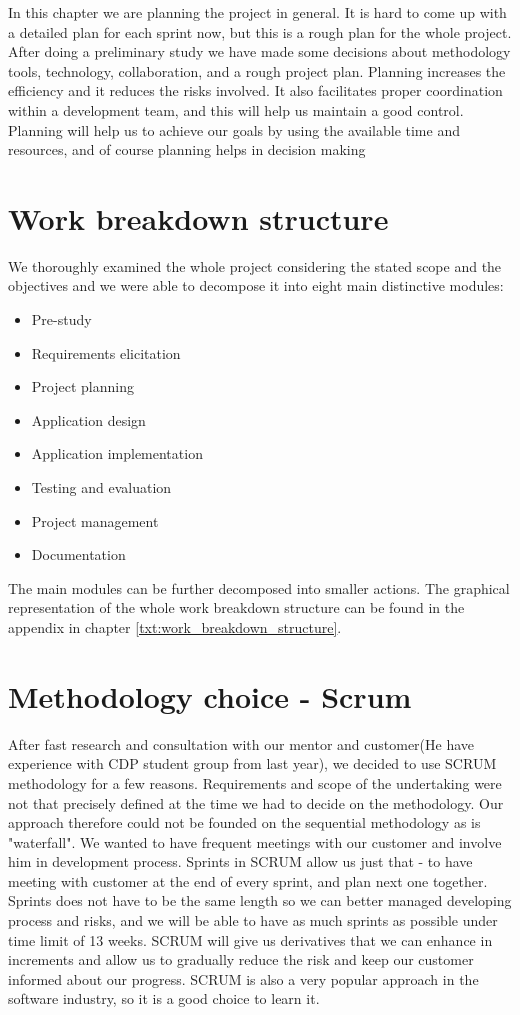 In this chapter we are planning the project in general. It is hard to come up with a detailed plan for each sprint now, but this is a rough plan for the whole project. After doing a preliminary study we have made some decisions about methodology tools, technology, collaboration, and a rough project plan. Planning increases the efficiency and it reduces the risks involved. It also facilitates proper coordination within a development team, and this will help us maintain a good control. Planning will help us to achieve our goals by using the available time and resources, and of course planning helps in decision making  

\section{Work breakdown structure}
\label{sec:wbs}
We thoroughly examined the whole project considering the stated scope and the objectives and we were able to decompose it into eight main distinctive modules:

\begin{itemize}
\item Pre-study
\item Requirements elicitation
\item Project planning
\item Application design
\item Application implementation
\item Testing and evaluation
\item Project management
\item Documentation
\end{itemize}

The main modules can be further decomposed into smaller actions. The graphical representation of the whole work breakdown structure can be found in the appendix in chapter \ref{txt:work_breakdown_structure}.

\section{Methodology choice - Scrum}
After fast research and consultation with our mentor and customer(He have experience with CDP student group from last year), we decided to use SCRUM methodology for a few reasons. Requirements and scope of the undertaking were not that precisely defined at the time we had to decide on the methodology. Our approach therefore could not be founded on the sequential methodology as is "waterfall". We wanted to have frequent meetings with our customer and involve him in development process. Sprints in SCRUM allow us just that - 
to have meeting with customer at the end of every sprint, and plan next one together. Sprints does not have to be the same length so we can better managed developing process and risks, and we will be able to have as much sprints as possible under time limit of 13 weeks. SCRUM will give us derivatives that we can enhance in increments and allow us to gradually reduce the risk and keep our customer informed about our progress. SCRUM is also a very popular approach in the software industry, so it is a good choice to learn it.

